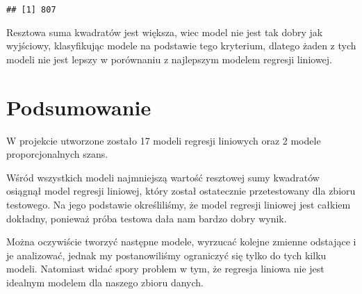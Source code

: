 \documentclass[
]{article}
\newenvironment{Shaded}{\begin{snugshade}}{\end{snugshade}}
\newcommand{\AttributeTok}[1]{\textcolor[rgb]{0.13,0.29,0.53}{#1}}
\newcommand{\DecValTok}[1]{\textcolor[rgb]{0.00,0.00,0.81}{#1}}
\newcommand{\FunctionTok}[1]{\textcolor[rgb]{0.13,0.29,0.53}{\textbf{#1}}}
\newcommand{\NormalTok}[1]{#1}
\newcommand{\OtherTok}[1]{\textcolor[rgb]{0.56,0.35,0.01}{#1}}
\newcommand{\SpecialCharTok}[1]{\textcolor[rgb]{0.81,0.36,0.00}{\textbf{#1}}}
\newcommand{\StringTok}[1]{\textcolor[rgb]{0.31,0.60,0.02}{#1}}
\begin{document}
\begin{Shaded}
\end{Shaded}

\begin{verbatim}
## [1] 807
\end{verbatim}

Resztowa suma kwadratów jest większa, wiec model nie jest tak dobry jak
wyjściowy, klasyfikując modele na podstawie tego kryterium, dlatego
żaden z tych modeli nie jest lepszy w porównaniu z najlepszym modelem
regresji liniowej.

\section{Podsumowanie}\label{podsumowanie}

W projekcie utworzone zostało 17 modeli regresji liniowych oraz 2 modele
proporcjonalnych szans.

Wśród wszystkich modeli najmniejszą wartość resztowej sumy kwadratów
osiągnął model regresji liniowej, który został ostatecznie przetestowany
dla zbioru testowego. Na jego podstawie określiliśmy, że model regresji
liniowej jest całkiem dokładny, ponieważ próba testowa dała nam bardzo
dobry wynik.

Można oczywiście tworzyć następne modele, wyrzucać kolejne zmienne
odstające i je analizować, jednak my postanowiliśmy ograniczyć się tylko
do tych kilku modeli. Natomiast widać spory problem w tym, że regresja
liniowa nie jest idealnym modelem dla naszego zbioru danych.
\end{document}
